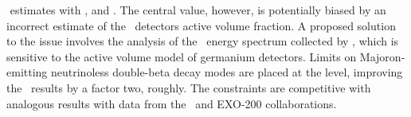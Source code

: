 \begin{itemize}
$$    estimates with ,  and . The central value,
    however, is potentially biased by an incorrect estimate of the \bege\ detectors active
    volume fraction. A proposed solution to the issue involves the analysis of the \Arl\
    energy spectrum collected by \gerda, which is sensitive to the active volume model of
    germanium detectors. Limits on Majoron-emitting neutrinoless double-beta decay modes
    are placed at the \powtenyr{23} level, improving the \phaseone\ results by a
    factor two, roughly. The constraints are competitive with analogous results with
    \nuc{Xe}{136} data from the \kamlandzen\ and EXO-200 collaborations.
\end{itemize}

